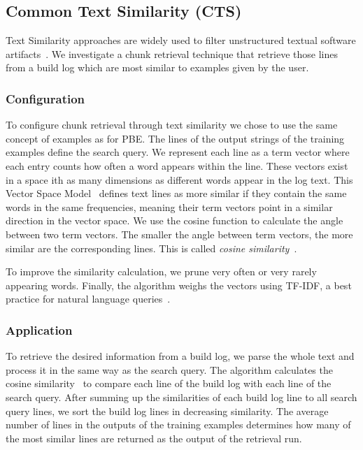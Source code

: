 \subsection{Common Text Similarity (CTS)}
Text Similarity approaches are widely used to filter unstructured
textual software artifacts~\cite{runeson2007detection,
marcus2005recovery,antoniol2002recovering,mccarey2006recommending}.
We investigate a chunk retrieval technique that
retrieve those lines from a build log which are most
similar to examples given by the user.

\subsubsection{Configuration}
To configure chunk retrieval through text similarity we chose to use
the same concept of examples as for PBE.
The lines of the output strings of the training examples define the
search query.
We represent each line as a term vector where each entry counts
how often a word appears within the line.
These vectors exist in a space ith as many dimensions as different
words appear in the log text.
This Vector Space Model~\cite{schutze2008introduction} defines
text lines as more similar if they contain the same words in the same
frequencies, meaning their term vectors point in a similar direction
in the vector space.
We use the cosine function to calculate the angle between two
term vectors.
The smaller the angle between term vectors, the more similar are the
corresponding lines.
This is called \emph{cosine similarity}~\cite{korenius2007principal}.

To improve the similarity calculation, we prune very often or
very rarely appearing words.
Finally, the
algorithm weighs the vectors using TF-IDF, a best practice for natural
language queries~\cite{lee1997document}.

\subsubsection{Application}
To retrieve the desired information from a build log, we parse the
whole text and process it in the same way as the search query.
The algorithm calculates the cosine
similarity~\cite{korenius2007principal} to compare each line of the
build log with each line of the search query.
After summing up the
similarities of each build log line to all search query lines, we sort
the build log lines in decreasing similarity.
The average number of
lines in the outputs of the training examples determines how many of
the most similar lines are returned as the output of the retrieval
run.


